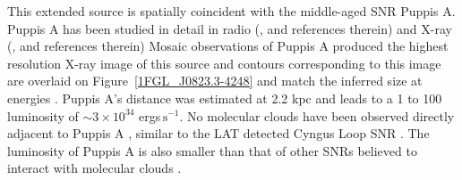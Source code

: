 \documentclass[12pt,preprint]{aastex}
\newcommand{\gev}{\text{GeV}\xspace}
\newcommand{\s}{\text{s}\xspace}
\newcommand{\rosat}{\text{{\em ROSAT}}\xspace}
\begin{document}
This extended source is spatially coincident with the
middle-aged SNR Puppis A.  Puppis A has been studied in detail
in radio (\cite{puppis_a_vla}, and references therein) and  X-ray
(\cite{rosat_puppis_a,suzaku_puppis_a}, and references therein) Mosaic
\rosat observations of Puppis A produced the highest resolution X-ray
image of this source and contours corresponding to this image are
overlaid on Figure~\ref{1FGL_J0823.3-4248} and match the inferred
size at \gev energies \citep{rosat_puppis_a}.  Puppis A's distance
was estimated at 2.2 kpc \citep{reynoso_1995,reynoso_2003} and leads
to a 1 \gev to 100 \gev luminosity of $\sim 3\times 10^{34}$ ergs$\,\s^{-1}$.
No molecular clouds have been observed directly adjacent to Puppis A
\citep{co_eastern_puppis_a}, similar to the LAT detected Cyngus
Loop SNR \citep{cygnus_loop_lat}.  The luminosity of Puppis A is also
smaller than that of other SNRs believed to interact with molecular clouds
\citep{w51c,ic443,w44,w28,w49b_lat}.


%
    
\end{document}
